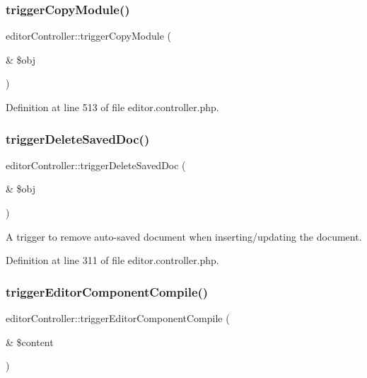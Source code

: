 \subsubsection{\texorpdfstring{trigger\+Copy\+Module()}{triggerCopyModule()}}
{\footnotesize\ttfamily editor\+Controller\+::trigger\+Copy\+Module (\begin{DoxyParamCaption}\item[{\&}]{\$obj }\end{DoxyParamCaption})}



Definition at line 513 of file editor.\+controller.\+php.

\mbox{\label{classeditorController_a9a141433e80917efe9280dc8eb4fe5c2}} 
\subsubsection{\texorpdfstring{trigger\+Delete\+Saved\+Doc()}{triggerDeleteSavedDoc()}}
{\footnotesize\ttfamily editor\+Controller\+::trigger\+Delete\+Saved\+Doc (\begin{DoxyParamCaption}\item[{\&}]{\$obj }\end{DoxyParamCaption})}



A trigger to remove auto-\/saved document when inserting/updating the document. 



Definition at line 311 of file editor.\+controller.\+php.

\mbox{\label{classeditorController_a6003487c398eae0676e15f5437cebdf8}} 
\subsubsection{\texorpdfstring{trigger\+Editor\+Component\+Compile()}{triggerEditorComponentCompile()}}
{\footnotesize\ttfamily editor\+Controller\+::trigger\+Editor\+Component\+Compile (\begin{DoxyParamCaption}\item[{\&}]{\$content }\end{DoxyParamCaption})}



